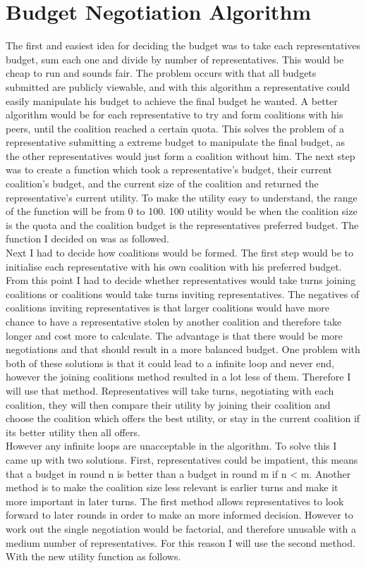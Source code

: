 \section{Budget Negotiation Algorithm }
The first and easiest idea for deciding the budget was to take each representatives budget, sum each one and divide by number of representatives. This would be cheap to run and sounds fair. The problem occurs with that all budgets submitted are publicly viewable, and with this algorithm a representative could easily manipulate his budget to achieve the final budget he wanted. 
A better algorithm would be for each representative to try and form coalitions with his peers, until the coalition reached a certain quota. This solves the problem of a representative submitting a extreme budget to manipulate the final budget, as the other representatives would just form a coalition without him.  
The next step was to create a function which took a representative’s budget, their current coalition’s budget, and the current size of the coalition and returned the representative’s current utility. To make the utility easy to understand, the range of the function will be from 0 to 100. 100 utility would be when the coalition size is the quota and the coalition budget is the representatives preferred budget. The function I decided on was as followed.
\\
Next I had to decide how coalitions would be formed. The first step would be to initialise each representative with his own coalition with his preferred budget. From this point I had to decide whether representatives would take turns joining coalitions or coalitions would take turns inviting representatives. The negatives of coalitions inviting representatives is that larger coalitions would have more chance to have a representative stolen by another coalition and therefore take longer and cost more to calculate. The advantage is that there would be more negotiations and that should result in a more balanced budget. One problem with both of these solutions is that it could lead to a infinite loop and never end, however the joining coalitions method resulted in a lot less of them. Therefore I will use that method. Representatives will take turns, negotiating with each coalition, they will then compare their utility by joining their coalition and choose the coalition which offers the best utility, or stay in the current coalition if its better utility then all offers. 
\\
However any infinite loops are unacceptable in the algorithm. To solve this I came up with two solutions. First, representatives could be impatient, this means that a budget in round n is better than a budget in round m if n < m. Another method is to make the coalition size less relevant is earlier turns and make it more important in later turns. The first method allows representatives to look forward to later rounds in order to make an more informed decision. However to work out the single negotiation would be factorial, and therefore unusable with a medium number of representatives. For this reason I will use the second method. With the new utility function as follows.  
